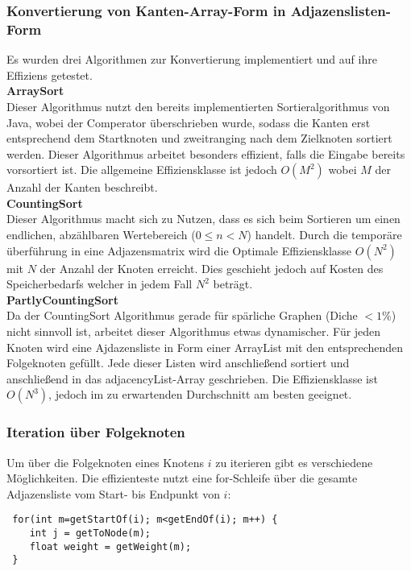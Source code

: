 \documentclass[a4paper,10pt]{article}
\begin{document}
\subsubsection{Konvertierung von Kanten-Array-Form in Adjazenslisten-Form}
Es wurden drei Algorithmen zur Konvertierung implementiert und auf ihre Effiziens getestet.\\
\textbf{ArraySort}\\
Dieser Algorithmus nutzt den bereits implementierten Sortieralgorithmus von Java, wobei der Comperator überschrieben wurde,
sodass die Kanten erst entsprechend dem Startknoten und zweitranging nach dem Zielknoten sortiert werden. Dieser Algorithmus arbeitet
besonders effizient, falls die Eingabe bereits vorsortiert ist. Die allgemeine Effiziensklasse ist jedoch $O(M^2)$ wobei $M$ der Anzahl der Kanten beschreibt.\\
\textbf{CountingSort}\\
Dieser Algorithmus macht sich zu Nutzen, dass es sich beim Sortieren um einen endlichen, abzählbaren Wertebereich ($0 \le n < N$) handelt.
Durch die temporäre überführung in eine Adjazensmatrix wird die Optimale Effiziensklasse $O(N^2)$ mit $N$ der Anzahl der Knoten erreicht.
Dies geschieht jedoch auf Kosten des Speicherbedarfs welcher in jedem Fall $N^2$ beträgt.\\
\textbf{PartlyCountingSort}\\
Da der CountingSort Algorithmus gerade für spärliche Graphen (Diche $< 1\%$) nicht sinnvoll ist, arbeitet dieser Algorithmus etwas dynamischer.
Für jeden Knoten wird eine Ajdazensliste in Form einer ArrayList mit den entsprechenden Folgeknoten gefüllt. Jede dieser Listen wird anschließend sortiert
und anschließend in das adjacencyList-Array geschrieben. Die Effiziensklasse ist $O(N^3)$, jedoch im zu erwartenden Durchschnitt am besten geeignet.

\subsubsection{Iteration über Folgeknoten}
Um über die Folgeknoten eines Knotens $i$ zu iterieren gibt es verschiedene Möglichkeiten.
Die effizienteste nutzt eine for-Schleife über die gesamte Adjazensliste vom Start- bis Endpunkt von $i$:
\begin{lstlisting}
 for(int m=getStartOf(i); m<getEndOf(i); m++) {
    int j = getToNode(m);
    float weight = getWeight(m);
 }
\end{lstlisting}
\end{document}
